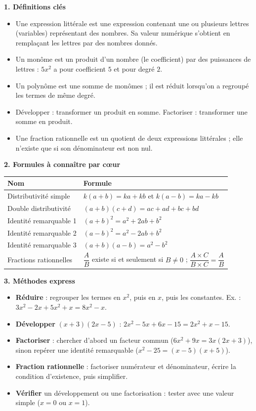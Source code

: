 \documentclass[11pt]{article}
\newcommand{\cle}[1]{{\popxbold\color{popdark}#1}}
\begin{document}
\begin{bilan}
\textbf{1. Définitions clés}
\begin{itemize}
  \item Une \cle{expression littérale} est une expression contenant une ou plusieurs lettres (variables) représentant des nombres. Sa \cle{valeur numérique} s'obtient en remplaçant les lettres par des nombres donnés.
  \item Un \cle{monôme} est un produit d'un nombre (le \cle{coefficient}) par des puissances de lettres : $5x^2$ a pour coefficient $5$ et pour degré $2$.
  \item Un \cle{polynôme} est une somme de monômes ; il est \cle{réduit} lorsqu'on a regroupé les termes de même degré.
  \item \cle{Développer} : transformer un produit en somme. \cle{Factoriser} : transformer une somme en produit.
  \item Une \cle{fraction rationnelle} est un quotient de deux expressions littérales ; elle n'existe que si son dénominateur est non nul.
\end{itemize}

\textbf{2. Formules à connaître par cœur}
\begin{center}
\begin{tabularx}{\linewidth}{|l|X|}
\hline
\rowcolor{popblueL} \textbf{Nom} & \textbf{Formule} \\
\hline
Distributivité simple & $k(a+b)=ka+kb$ \quad et \quad $k(a-b)=ka-kb$ \\
\hline
Double distributivité & $(a+b)(c+d)=ac+ad+bc+bd$ \\
\hline
Identité remarquable 1 & $(a+b)^2=a^2+2ab+b^2$ \\
\hline
Identité remarquable 2 & $(a-b)^2=a^2-2ab+b^2$ \\
\hline
Identité remarquable 3 & $(a+b)(a-b)=a^2-b^2$ \\
\hline
Fractions rationnelles & $\dfrac{A}{B}$ existe si et seulement si $B\neq 0$ ; $\dfrac{A\times C}{B\times C}=\dfrac{A}{B}$ \\
\hline
\end{tabularx}
\end{center}

\textbf{3. Méthodes express}
\begin{itemize}
  \item \textbf{Réduire} : regrouper les termes en $x^2$, puis en $x$, puis les constantes. Ex. : $3x^2-2x+5x^2+x=8x^2-x$.
  \item \textbf{Développer} $(x+3)(2x-5)$ : $2x^2-5x+6x-15=2x^2+x-15$.
  \item \textbf{Factoriser} : chercher d'abord un \cle{facteur commun} ($6x^2+9x=3x(2x+3)$), sinon repérer une identité remarquable ($x^2-25=(x-5)(x+5)$).
  \item \textbf{Fraction rationnelle} : factoriser numérateur et dénominateur, écrire la condition d'existence, puis simplifier.
  \item \textbf{Vérifier} un développement ou une factorisation : tester avec une valeur simple ($x=0$ ou $x=1$).
\end{itemize}
\end{bilan}
\end{document}
